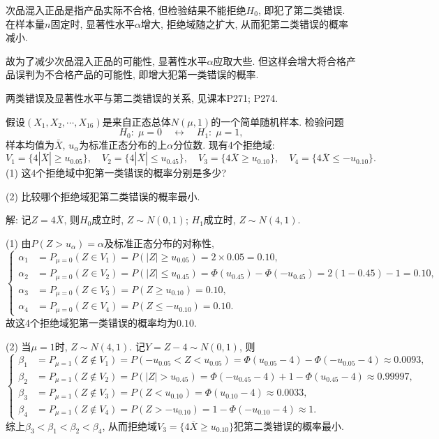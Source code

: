 \documentclass[standard]{ExBook}
\renewenvironment{shaded}{%
  \def\FrameCommand{\fboxsep=\FrameSep \colorbox{shadecolor}}%
  \MakeFramed{\advance\hsize-\width \FrameRestore}%
}{%
  \endMakeFramed
}
\begin{document}
\begin{qitems}
次品混入正品是指产品实际不合格, 但检验结果不能拒绝$H_0$, 即犯了第二类错误. 在样本量$n$固定时, 显著性水平$\alpha$增大, 拒绝域随之扩大, 从而犯第二类错误的概率减小.

故为了减少次品混入正品的可能性, 显著性水平$\alpha$应取大些. 但这样会增大将合格产品误判为不合格产品的可能性, 即增大犯第一类错误的概率.

\textcolor{themeColor}{\selectfont {} 两类错误及显著性水平与第二类错误的关系, 见课本P271; P274.}

\vspace{2.5cm-5em}

    \begin{bbox} 
    \begin{shaded}
        \qitem
假设$\left(X_1, X_2, \cdots, X_{16}\right)$是来自正态总体$N(\mu, 1)$的一个简单随机样本. 检验问题
\[
H_0: \; \mu = 0 \quad \longleftrightarrow \quad H_1: \; \mu = 1,
\]
样本均值为$\bar X$, $u_{\alpha}$为标准正态分布的上$\alpha$分位数. 现有4个拒绝域:
\[
V_1 = \{4|\overline{X}| \ge u_{0.05}\}, \quad
V_2 = \{4|\overline{X}| \le u_{0.45}\}, \quad
V_3 = \{4\overline{X} \ge u_{0.10}\}, \quad
V_4 = \{4\overline{X} \le -u_{0.10}\}.
\]
(1) 这4个拒绝域中犯第一类错误的概率分别是多少?

(2) 比较哪个拒绝域犯第二类错误的概率最小.
    \end{shaded}
    \end{bbox}

\vspace{\dimexpr2.5cm-5em\relax}

解: 记$Z=4\overline{X}$, 则$H_0$成立时, $Z\sim N(0,1)$; $H_1$成立时, $Z\sim N(4,1)$.

(1) 由$P(Z>u_{\alpha})=\alpha$及标准正态分布的对称性,
$$
\left\{
\begin{aligned}
\alpha_1
&=P_{\mu=0}(Z\in V_1)
=P(|Z|\geq u_{0.05})
=2\times0.05
=0.10,\\
\alpha_2
&=P_{\mu=0}(Z\in V_2)
=P(|Z|\leq u_{0.45})
=\Phi(u_{0.45})-\Phi(-u_{0.45})
=2(1-0.45)-1
=0.10,\\
\alpha_3
&=P_{\mu=0}(Z\in V_3)
=P(Z\geq u_{0.10})
=0.10,\\
\alpha_4
&=P_{\mu=0}(Z\in V_4)
=P(Z\leq-u_{0.10})
=0.10.
\end{aligned}
\right.
$$
故这4个拒绝域犯第一类错误的概率均为$0.10$.

(2) 当$\mu=1$时, $Z\sim N(4,1)$. 记$Y=Z-4\sim N(0,1)$, 则
$$
\left\{
\begin{aligned}
\beta_1
&=P_{\mu=1}(Z\notin V_1)
=P(-u_{0.05}<Z<u_{0.05})
=\Phi(u_{0.05}-4)-\Phi(-u_{0.05}-4)
\approx0.0093,\\
\beta_2
&=P_{\mu=1}(Z\notin V_2)
=P(|Z|>u_{0.45})
=\Phi(-u_{0.45}-4)+1-\Phi(u_{0.45}-4)
\approx0.99997,\\
\beta_3
&=P_{\mu=1}(Z\notin V_3)
=P(Z<u_{0.10})
=\Phi(u_{0.10}-4)
\approx0.0033,\\
\beta_4
&=P_{\mu=1}(Z\notin V_4)
=P(Z>-u_{0.10})
=1-\Phi(-u_{0.10}-4)
\approx1.
\end{aligned}
\right.
$$
综上$\beta_3<\beta_1<\beta_2<\beta_4$, 从而拒绝域$V_3=\{4\overline{X}\geq u_{0.10}\}$犯第二类错误的概率最小.


\end{qitems}
\end{document}
